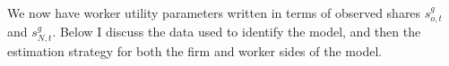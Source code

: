 \documentclass[12pt]{article}
\begin{document}
We now have worker utility parameters written in terms of observed shares $s^g_{o,t}$ and $s^g_{N,t}$. Below I discuss the data used to identify the model, and then the estimation strategy for both the firm and worker sides of the model.

















%
%



\end{document}
